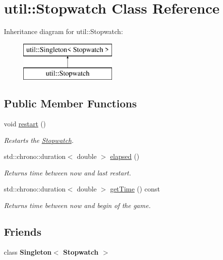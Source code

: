 \hypertarget{classutil_1_1_stopwatch}{}\section{util\+:\+:Stopwatch Class Reference}
\label{classutil_1_1_stopwatch}
Inheritance diagram for util\+:\+:Stopwatch\+:\begin{figure}[H]
\begin{center}
\leavevmode
\includegraphics[height=2.000000cm]{dd/d6f/classutil_1_1_stopwatch}
\end{center}
\end{figure}
\subsection*{Public Member Functions}
\begin{DoxyCompactItemize}
\item 
\mbox{\label{classutil_1_1_stopwatch_a65eca44477d2d1dfe4393c5111d18e06}} 
void \mbox{\hyperlink{classutil_1_1_stopwatch_a65eca44477d2d1dfe4393c5111d18e06}{restart}} ()
\begin{DoxyCompactList}\small\item\em Restarts the \mbox{\hyperlink{classutil_1_1_stopwatch}{Stopwatch}}. \end{DoxyCompactList}\item 
std\+::chrono\+::duration$<$ double $>$ \mbox{\hyperlink{classutil_1_1_stopwatch_a24598e1f60920a455f65a0b730043bcf}{elapsed}} ()
\begin{DoxyCompactList}\small\item\em Returns time between now and last restart. \end{DoxyCompactList}\item 
std\+::chrono\+::duration$<$ double $>$ \mbox{\hyperlink{classutil_1_1_stopwatch_a54385cbe9d8e3b42f9af7508bd3c49ec}{get\+Time}} () const
\begin{DoxyCompactList}\small\item\em Returns time between now and begin of the game. \end{DoxyCompactList}\end{DoxyCompactItemize}
\subsection*{Friends}
\begin{DoxyCompactItemize}
\item 
\mbox{\label{classutil_1_1_stopwatch_abc6f85aad8332653a976dc16390a0bdc}} 
class {\bfseries Singleton$<$ Stopwatch $>$}
\end{DoxyCompactItemize}
